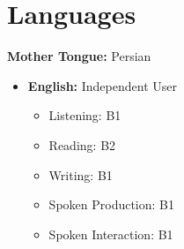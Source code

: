 \documentclass[a4paper,11pt]{article}
\begin{document}
\section{\textbf{Languages}}
\vspace{-0.4mm}

\textbf{Mother Tongue:} Persian \\
\begin{itemize}
  \item \textbf{English:} Independent User \begin{itemize}
      \item Listening: B1
      \item Reading: B2
      \item Writing: B1
      \item Spoken Production: B1
      \item Spoken Interaction: B1 \end{itemize}
\end{itemize}

\vspace{-4mm}
\end{document}
